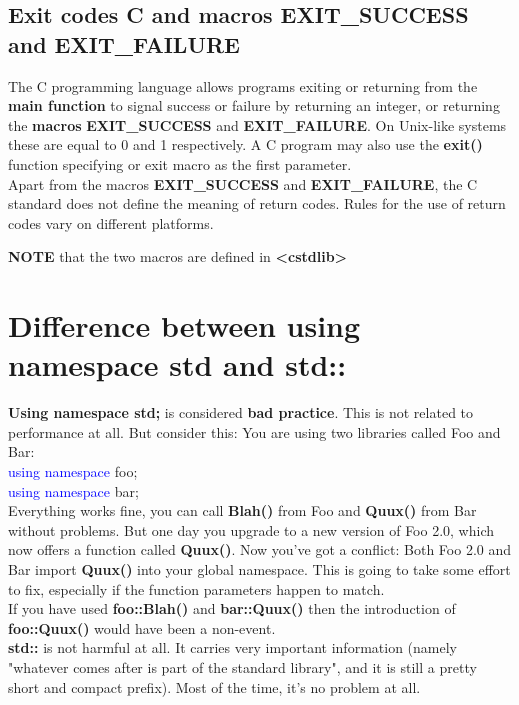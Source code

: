 	\subsection{Exit codes C and macros EXIT\_SUCCESS and EXIT\_FAILURE}
	The C programming language allows programs exiting or returning from the \textbf{main function} to signal success or failure by returning an integer, or returning the \textbf{macros} \textbf{EXIT\_SUCCESS} and \textbf{EXIT\_FAILURE}. On Unix-like systems these are equal to 0 and 1 respectively. A C program may also use the \textbf{exit()} function specifying or exit macro as the first parameter.\\
	
	Apart from the macros \textbf{EXIT\_SUCCESS} and \textbf{EXIT\_FAILURE}, the C standard does not define the meaning of return codes. Rules for the use of return codes vary on different platforms.
	
	\textbf{NOTE} that the two macros are defined in \textbf{\textless cstdlib\textgreater}
	
	\section{Difference between using namespace std and std::}
	\textbf{Using namespace std;} is considered \textbf{bad practice}. This is not related to performance at all. But consider this: You are using two libraries called Foo and Bar:\\
	
	\textcolor{blue}{using namespace} foo;\\
	\textcolor{blue}{using namespace} bar;\\
	
	Everything works fine, you can call \textbf{Blah()} from Foo and \textbf{Quux()} from Bar without problems. But one day you upgrade to a new version of Foo 2.0, which now offers a function called \textbf{Quux()}. Now you've got a conflict: Both Foo 2.0 and Bar import \textbf{Quux()} into your global namespace. This is going to take some effort to fix, especially if the function parameters happen to match.\\
	
	If you have used \textbf{foo::Blah()} and \textbf{bar::Quux()} then the introduction of \textbf{foo::Quux()} would have been a non-event.\\
	
	\textbf{std::} is not harmful at all. It carries very important information (namely "whatever comes after is part of the standard library", and it is still a pretty short and compact prefix). Most of the time, it's no problem at all. 
	

